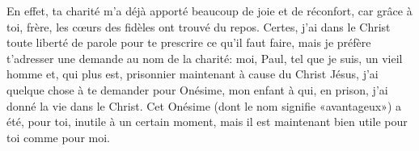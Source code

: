 En effet, ta charité m’a déjà apporté beaucoup de joie et de réconfort,
	car grâce à toi, frère, les cœurs des fidèles ont trouvé du repos.
Certes, j’ai dans le Christ toute liberté de parole pour te prescrire ce qu’il faut faire,
	mais je préfère t’adresser une demande au nom de la charité:
	moi, Paul, tel que je suis, un vieil homme
	et, qui plus est, prisonnier maintenant à cause du Christ Jésus,
	j’ai quelque chose à te demander pour Onésime,
	mon enfant à qui, en prison, j’ai donné la vie dans le Christ.
Cet Onésime (dont le nom signifie «avantageux»)
	a été, pour toi, inutile à un certain moment,
	mais il est maintenant bien utile pour toi comme pour moi.
